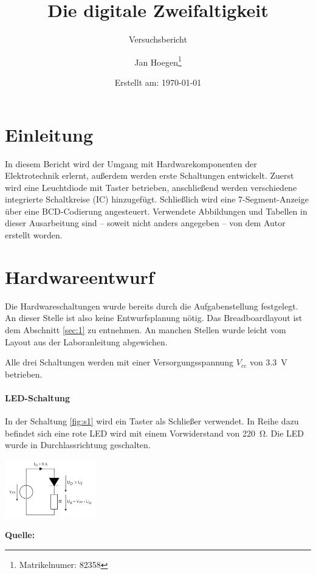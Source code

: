 \documentclass[
    paper=a4,
]{scrartcl}
\title{Die digitale Zweifaltigkeit}
\subtitle{Versuchsbericht}
\author{Jan Hoegen\thanks{Matrikelnumer: 82358}}
\date{Erstellt am: \today}
\newcommand{\figsource}[1]{\par\footnotesize\textbf{Quelle:} #1\par}
\begin{document}
\maketitle

\tableofcontents

\newpage

\section{Einleitung}
    In diesem Bericht wird der Umgang mit  Hardwarekomponenten der Elektrotechnik erlernt, außerdem werden erste Schaltungen entwickelt. Zuerst wird eine Leuchtdiode mit Taster betrieben, anschließend werden verschiedene integrierte Schaltkreise (IC) hinzugefügt. Schließlich wird eine 7-Segment-Anzeige über eine BCD-Codierung angesteuert. Verwendete Abbildungen und Tabellen in dieser Ausarbeitung sind -- soweit nicht anders angegeben -- von dem Autor erstellt worden.
    
\section{Hardwareentwurf}
    Die Hardwareschaltungen wurde bereits durch die Aufgabenstellung festgelegt. An dieser Stelle ist also keine Entwurfsplanung nötig. Das Breadboardlayout ist dem Abschnitt \ref{sec:1} zu entnehmen. An manchen Stellen wurde leicht vom Layout aus der Laboranleitung abgewichen.

    Alle drei Schaltungen werden mit einer Versorgungsspannung \(V_{cc}\) von \SI{3.3}{\volt} betrieben. 

    \paragraph{LED-Schaltung}
        In der Schaltung \ref{fig:s1} wird ein Taster als Schließer verwendet. In Reihe dazu befindet sich eine rote LED wird mit einem Vorwiderstand von \SI{220}{\ohm}. Die LED wurde in Durchlassrichtung geschalten.

        \begin{center}
            \includegraphics[width=0.3\textwidth]{Anhang/Schaltung1.png}
            \figsource{\cite{bauer}}
            \label{fig:s1}
        \end{center}
\end{document}
